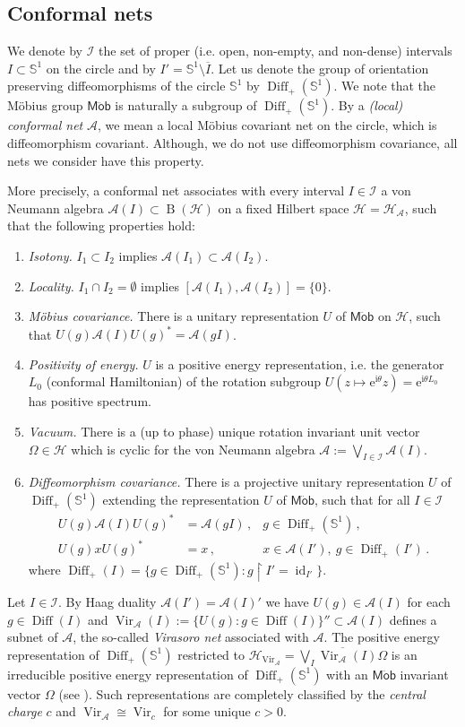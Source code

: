 \documentclass[twoside,11pt,reqno]{amsart}
\makeatletter
\theoremstyle{definition}
\theoremstyle{remark}
\newcommand{\Hil}{\mathcal{H}}
\newcommand{\Mob}{\mathsf{M\ddot ob}}
\newcommand{\Sc}[1][]{\mathbb{S}^{1#1}}
\newcommand{\A}{\mathcal{A}}
\newcommand{\cI}{\mathcal{I}}
\DeclareMathOperator{\Diff}{Diff}
\DeclareMathOperator{\Vir}{Vir}
\DeclareMathOperator{\id}{id}
\DeclareMathOperator{\B}{B}
\newcommand{\e}{\mathrm{e}}
\newcommand{\ima}{\mathrm{i}}
\DeclareRobustCommand{\ie}{i.e.\@\xspace}
\newcommand{\myemph}[1]{\emph{#1}}
\makeatother
\begin{document}
\subsection{Conformal nets}
\label{subsec:CN}
We denote by $\cI$ the set of proper (\ie open, non-empty, and non-dense) 
intervals $I\subset \Sc$ on the circle and by $I'=\Sc\setminus \overline{I}$. 
Let us denote the group of orientation preserving diffeomorphisms of the circle
$\Sc$ by $\Diff_+(\Sc)$. 
We note that the M\"obius group $\Mob$ is naturally a subgroup of 
$\Diff_+(\Sc)$.
By a \myemph{(local) conformal net} $\A$, we mean a 
local M\"obius covariant net on the
circle, which is diffeomorphism covariant. 
Although, we do not use diffeomorphism covariance, all nets we consider have 
this property.

More precisely, a conformal net associates with every interval $I\in\cI$ a von 
Neumann algebra $\A(I)\subset \B(\Hil)$ on a fixed Hilbert space $\Hil=\Hil_\A$,
such that the following properties hold:
\begin{enumerate}[{\bf A.}]
  \item \myemph{Isotony.} $I_1\subset I_2$ implies $\A(I_1)\subset \A(I_2)$.
  \item \myemph{Locality.} $I_1  \cap I_2 = \emptyset$ implies 
    $[\A(I_1),\A(I_2)]=\{0\}$.
  \item \myemph{Möbius covariance.} There is a unitary representation $U$ of 
    $\Mob$ on $\Hil$, such that $U(g)\A(I)U(g)^\ast = \A(gI)$.
  \item \myemph{Positivity of energy.} $U$ is a positive energy representation,
    \ie the generator $L_0$ (conformal Hamiltonian) of the rotation subgroup 
    $U(z\mapsto \e^{\ima \theta}z)=\e^{\ima \theta L_0}$ has positive spectrum.
  \item \myemph{Vacuum.} There is a (up to phase) unique rotation invariant 
    unit vector $\Omega \in \Hil$ which is cyclic for the von Neumann algebra 
    $\A:=\bigvee_{I\in\cI} \A(I)$.
  \item \myemph{Diffeomorphism covariance.} There is a projective unitary 
    representation $U$ of $\Diff_+(\Sc)$ extending the representation $U$ of
    $\Mob$, such that for all $I\in\cI$ 
    \begin{align*}
      U(g)\A(I)U(g)^\ast &= \A(gI)\,, & g\in \Diff_+(\Sc)\,, \\
      U(g)xU(g)^\ast &= x\,, &x\in \A(I'),~ g\in \Diff_+(I')
      \,.
    \end{align*}
    where $\Diff_+(I)=\{ g\in\Diff_+(\Sc) : g\restriction I'=\id_{I'}\}$.
\end{enumerate}
Let $I\in\cI$. 
By Haag duality $\A(I')=\A(I)'$ \cite{GaFr1993,BrGuLo1993} we have 
$U(g)\in\A(I)$ for each $g\in \Diff(I)$ and 
$\Vir_\A(I):=\{U(g): g\in\Diff(I)\}''\subset\A(I)$ defines a subnet of $\A$, 
the so-called \myemph{Virasoro net} associated with $\A$.
The positive energy representation of $\Diff_+(\Sc)$ restricted to 
$\Hil_{\Vir_\A}=\overline{\bigvee_I\Vir_\A(I)\Omega}$ is an irreducible 
positive energy representation of $\Diff_+(\Sc)$ with an $\Mob$ invariant 
vector $\Omega$ (see \cite{Ca2004,CaWe2005}). 
Such representations are completely classified by the \myemph{central charge}
$c$ and $\Vir_\A\cong\Vir_c$ for some unique $c>0$.
\end{document}
